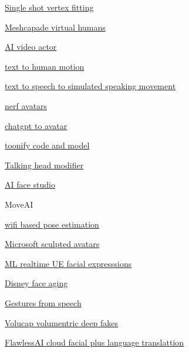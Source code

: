         \href{https://arxiv.org/abs/2205.06254}{Single shot vertex
        fitting}
       
        \href{https://meshcapade.com/}{Meshcapade virtual humans}
       
        \href{https://share.synthesia.io/a5a12c73-09cb-4455-b007-147ae4b1effb}{AI
        video actor}
       
        \href{https://ofa-sys.github.io/MoFusion/}{text to human motion}
       
        \href{https://talkshow.is.tue.mpg.de/}{text to speech to
        simulated speaking movement}
       
        \href{https://www.linkedin.com/posts/reneschulte_nerf-deeplearning-metaverse-activity-7010898662465617921-56P_?utm_source=share\&utm_medium=member_desktop}{nerf
        avatars}
       
        \href{https://twitter.com/IntuitMachine/status/1608690077139599360}{chatgpt
        to avatar}
       
        \href{https://www.mmlab-ntu.com/project/vtoonify/}{toonify code
        and model}
       
        \href{https://github.com/Meta-Portrait/MetaPortrait}{Talking
        head modifier}
       
        \href{https://www.d-id.com/}{AI face studio}
       
        MoveAI
       
        \href{http://arxiv.org/pdf/2301.00250.pdf}{wifi based pose
        estimation}
       
        \href{https://3d-avatar-diffusion.microsoft.com/?utm_campaign=AI\%20Art\%20Weekly\&utm_medium=email\&utm_source=Revue\%20newsletter\#/}{Microsoft
        sculpted avatars}
       
        \href{https://80.lv/articles/ziva-dynamics-announces-a-new-ml-trained-facial-rigging-service/}{ML
        realtime UE facial expresssions}
       
        \href{https://studios.disneyresearch.com/2022/11/30/production-ready-face-re-aging-for-visual-effects/}{Disney
        face aging}
       
        \href{https://talkshow.is.tue.mpg.de/}{Gestures from speech}
       
        \href{https://volucap.com/}{Volucap volumentric deep fakes}
       
        \href{https://www.flawlessai.com/}{FlawlessAI cloud facial plus
        language translattion}
       
